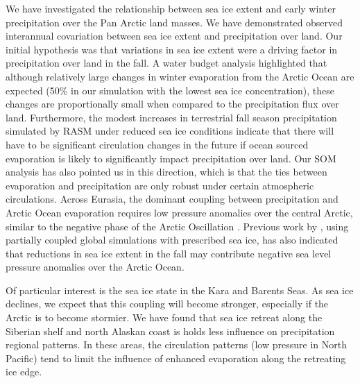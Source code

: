 We have investigated the relationship between sea ice extent and early winter precipitation over the Pan Arctic land masses.
We have demonstrated observed interannual covariation between sea ice extent and precipitation over land.
Our initial hypothesis was that variations in sea ice extent were a driving factor in precipitation over land in the fall.
A water budget analysis highlighted that although relatively large changes in winter evaporation from the Arctic Ocean are expected (50\% in our simulation with the lowest sea ice concentration), these changes are proportionally small when compared to the precipitation flux over land.
Furthermore, the modest increases in terrestrial fall season precipitation simulated by RASM under reduced sea ice conditions indicate that there will have to be significant circulation changes in the future if ocean sourced evaporation is likely to significantly impact precipitation over land.
Our SOM analysis has also pointed us in this direction, which is that the ties between evaporation and precipitation are only robust under certain atmospheric circulations.
Across Eurasia, the dominant coupling between precipitation and Arctic Ocean evaporation requires low pressure anomalies over the central Arctic, similar to the negative phase of the Arctic Oscillation \citep{Thompson_1998}.
Previous work by \citet{Cassano_2014}, using partially coupled global simulations with prescribed sea ice, has also indicated that reductions in sea ice extent in the fall may contribute negative sea level pressure anomalies over the Arctic Ocean.

Of particular interest is the sea ice state in the Kara and Barents Seas.
As sea ice declines, we expect that this coupling will become stronger, especially if the Arctic is to become stormier.
We have found that sea ice retreat along the Siberian shelf and north Alaskan coast is holds less influence on precipitation regional patterns.
In these areas, the circulation patterns (low pressure in North Pacific) tend to limit the influence of enhanced evaporation along the retreating ice edge.
